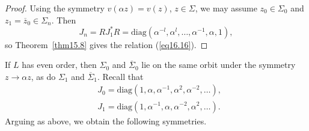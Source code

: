 \documentclass{surv-l}
\theoremstyle{plain}
\theoremstyle{definition}
\numberwithin{equation}{chapter}
\begin{document}
\begin{proof}
Using the symmetry $v(\alpha z)=v(z)$, $ z\in\Sigma$, we may assume $z_{0}\in\Sigma_{0}$ and $z_{1}=\overline{z}_{0}\in\Sigma_{n}$. Then
\begin{equation*}
J_{n}=RJ_{1}^{*}R= \mathrm{diag}(\alpha^{-l}, \alpha^{l}, \ldots, \alpha^{-1}, \alpha, 1),
\end{equation*}
so Theorem~\ref{thm15.8} gives the relation (\ref{eq16.16}).
\end{proof}
If $L$ has even order, then $\Sigma_{0}$ and $\overline{\Sigma}_{0}$ lie on the same orbit under the symmetry $z\rightarrow\alpha z$, as do $\Sigma_{1}$ and $\overline{\Sigma}_{1}$. Recall that
\begin{align*}
&J_{0}= \mathrm{diag} (1, \alpha, \alpha^{-1}, \alpha^{2},\alpha^{-2}, \ldots) ,\\
&J_{1}= \mathrm{diag} (1,\alpha^{-1},\alpha, \alpha^{-2}, \alpha^{2},\ldots).
\end{align*}
Arguing as above, we obtain the following symmetries.
\setcounter{theorem}{16}
\end{document}
